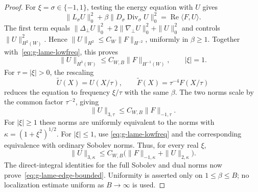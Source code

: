 \documentclass[11pt,a4paper]{article}
\theoremstyle{remark}
\numberwithin{equation}{section}
\begin{document}
\begin{proof}
For $\xi=\sigma\in\{-1,1\}$, testing the energy equation with $U$ gives
\[
 \|L_\sigma U\|_0^2
  +\beta\|D_\sigma\operatorname{Div}_\sigma U\|_0^2
  =\operatorname{Re}\langle F,U\rangle.
\]
The first term equals
$\|\Delta_\perp U\|_0^2+2\|\nabla_\perp U\|_0^2+\|U\|_0^2$
and controls $\|U\|_{H^2(W)}^2$. Hence
$\|U\|_{H^2}\le C_W\|F\|_{H^{-2}}$, uniformly in $\beta\ge1$.
Together with~\eqref{eq:g-lame-lowfreq}, this proves
\[
 \|U\|_{H^3(W)}\le C_{W,B}\|F\|_{H^{-1}(W)},
 \qquad |\xi|=1.
\]
For $\tau=|\xi|>0$, the rescaling
\[
 \widetilde U(X)=U(X/\tau),\qquad
 \widetilde F(X)=\tau^{-4}F(X/\tau)
\]
reduces the equation to frequency $\xi/\tau$ with the same $\beta$.
The two norms scale by the common factor $\tau^{-2}$, giving
\[
 \|U\|_{3,\tau}\le C_{W,B}\|F\|_{-1,\tau}.
\]
For $|\xi|\ge1$ these norms are uniformly equivalent to the norms with
$\kappa=(1+\xi^2)^{1/2}$. For $|\xi|\le1$, use
\eqref{eq:g-lame-lowfreq} and the corresponding equivalence with ordinary
Sobolev norms. Thus, for every real $\xi$,
\[
 \|U\|_{3,\kappa}
 \le C_{W,B}\bigl(\|F\|_{-1,\kappa}+\|U\|_{2,\kappa}\bigr).
\]
The direct-integral identities for the full Sobolev and dual norms now
prove~\eqref{eq:g-lame-edge-bounded}. Uniformity is asserted only on
$1\le\beta\le B$; no localization estimate uniform as $B\to\infty$ is used.
\end{proof}
\end{document}
